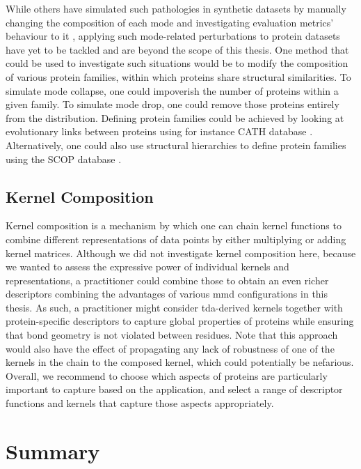 While others have simulated such pathologies in synthetic datasets by manually
changing the composition of each mode and investigating evaluation metrics'
behaviour to it \citep{thompson2022evaluation}, applying such mode-related
perturbations to protein datasets have yet to be tackled and are beyond the
scope of this thesis. One method that could be used to investigate such
situations would be to modify the composition of various protein families,
within which proteins share structural similarities. To simulate mode collapse,
one could impoverish the number of proteins within a given family. To simulate
mode drop, one could remove those proteins entirely from the distribution.
Defining protein families could be achieved by looking at evolutionary links
between proteins using for instance CATH database \citep{orengo1997cath}.
Alternatively, one could also use structural hierarchies to define protein
families using the SCOP database \citep{murzin1995scop}.

\subsection{Kernel Composition}

Kernel composition is a mechanism by which one can chain kernel functions to
combine different representations of data points by either multiplying or adding
kernel matrices. Although we did not investigate kernel composition here,
because we wanted to assess the expressive power of individual kernels and
representations, a practitioner could combine those to obtain an even richer
descriptors combining the advantages of various \gls{mmd} configurations in this
thesis. As such, a practitioner might consider \gls{tda}-derived kernels together with
protein-specific descriptors to capture global properties of proteins while
ensuring that bond geometry is not violated between residues. Note that this
approach would also have the effect of propagating any lack of robustness of one
of the kernels in the chain to the composed kernel, which could potentially be
nefarious. Overall, we recommend to choose which aspects of proteins are
particularly important to capture based on the application, and select a range
of descriptor functions and kernels that capture those aspects appropriately.

\section{Summary}


